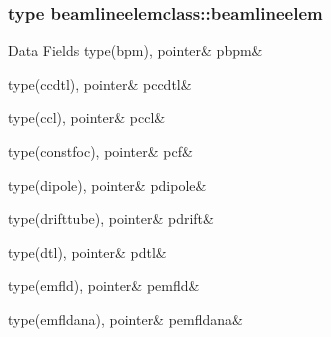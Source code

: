 \subsubsection{type beamlineelemclass\+::beamlineelem}
\begin{DoxyFields}{Data Fields}
\mbox{\label{namespacebeamlineelemclass_ab1486848bf9231eeed15a83170442e32}} 
type(bpm), pointer&
pbpm&
\\
\hline

\mbox{\label{namespacebeamlineelemclass_afc03034604a05eb1bc374945e4ab176d}} 
type(ccdtl), pointer&
pccdtl&
\\
\hline

\mbox{\label{namespacebeamlineelemclass_ac12416dfd09e0a7195c5297b12c1194f}} 
type(ccl), pointer&
pccl&
\\
\hline

\mbox{\label{namespacebeamlineelemclass_a39cb4d5220b28f075e92fd09819f86ce}} 
type(constfoc), pointer&
pcf&
\\
\hline

\mbox{\label{namespacebeamlineelemclass_a2427f96729e2667041326c4dcf583b82}} 
type(dipole), pointer&
pdipole&
\\
\hline

\mbox{\label{namespacebeamlineelemclass_a295bb7932c8566c26f980d0bd89d2f7d}} 
type(drifttube), pointer&
pdrift&
\\
\hline

\mbox{\label{namespacebeamlineelemclass_a8efdbd654fcb17a5dcf4826638e79720}} 
type(dtl), pointer&
pdtl&
\\
\hline

\mbox{\label{namespacebeamlineelemclass_a626e5426ee98993dfe2352be10075411}} 
type(emfld), pointer&
pemfld&
\\
\hline

\mbox{\label{namespacebeamlineelemclass_a9da0a18e62bab91e16cf56935313b210}} 
type(emfldana), pointer&
pemfldana&
\\
\hline


\end{DoxyFields}
